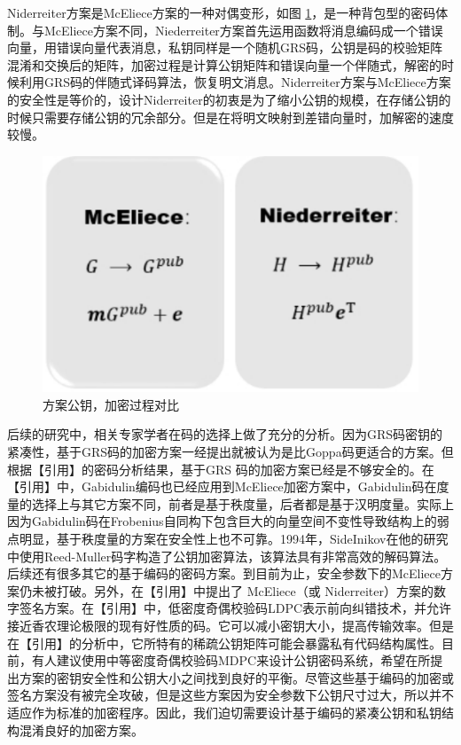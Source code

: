 Niderreiter方案是McEliece方案的一种对偶变形，如图 \ref{fig:comparator_pdf}，是一种背包型的密码体制。与McEliece方案不同，Niederreiter方案首先运用函数将消息编码成一个错误向量，用错误向量代表消息，私钥同样是一个随机GRS码，公钥是码的校验矩阵混淆和交换后的矩阵，加密过程是计算公钥矩阵和错误向量一个伴随式，解密的时候利用GRS码的伴随式译码算法，恢复明文消息。Niderreiter方案与McEliece方案的安全性是等价的，设计Niderreiter的初衷是为了缩小公钥的规模，在存储公钥的时候只需要存储公钥的冗余部分。但是在将明文映射到差错向量时，加解密的速度较慢。

\begin{figure}[H]
	\centering
	\includegraphics{fig/comparator.pdf}
	\caption{方案公钥，加密过程对比} %
	\label{fig:comparator_pdf}
\end{figure}

后续的研究中，相关专家学者在码的选择上做了充分的分析。因为GRS码密钥的紧凑性，基于GRS码的加密方案一经提出就被认为是比Goppa码更适合的方案。但根据【引用】的密码分析结果，基于GRS 码的加密方案已经是不够安全的。在【引用】中，Gabidulin编码也已经应用到McEliece加密方案中，Gabidulin码在度量的选择上与其它方案不同，前者是基于秩度量，后者都是基于汉明度量。实际上因为Gabidulin码在Frobenius自同构下包含巨大的向量空间不变性导致结构上的弱点明显，基于秩度量的方案在安全性上也不可靠。1994年，SideInikov在他的研究中使用Reed-Muller码字构造了公钥加密算法，该算法具有非常高效的解码算法。后续还有很多其它的基于编码的密码方案。到目前为止，安全参数下的McEliece方案仍未被打破。另外，在【引用】中提出了 McEliece（或 Niderreiter）方案的数字签名方案。在【引用】中，低密度奇偶校验码LDPC表示前向纠错技术，并允许接近香农理论极限的现有好性质的码。它可以减小密钥大小，提高传输效率。但是在【引用】的分析中，它所特有的稀疏公钥矩阵可能会暴露私有代码结构属性。目前，有人建议使用中等密度奇偶校验码MDPC来设计公钥密码系统，希望在所提出方案的密钥安全性和公钥大小之间找到良好的平衡。尽管这些基于编码的加密或签名方案没有被完全攻破，但是这些方案因为安全参数下公钥尺寸过大，所以并不适应作为标准的加密程序。因此，我们迫切需要设计基于编码的紧凑公钥和私钥结构混淆良好的加密方案。

